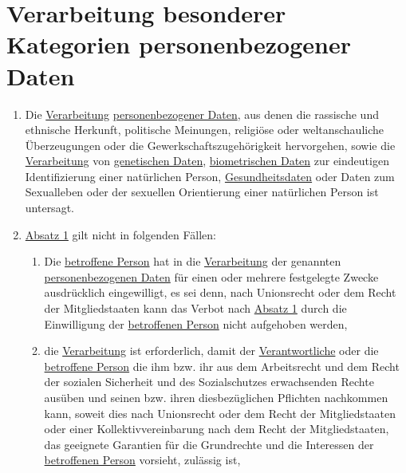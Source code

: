 \chapter{Verarbeitung besonderer Kategorien personenbezogener Daten}
\label{ch:9}


\begin{enumerate}

  \item Die \hyperref[itm:04-2]{Verarbeitung} \hyperref[itm:04-1]{personenbezogener Daten}, aus denen die rassische und ethnische Herkunft, politische Meinungen,
   religiöse oder weltanschauliche Überzeugungen oder die Gewerkschaftszugehörigkeit hervorgehen, sowie die
   \hyperref[itm:04-2]{Verarbeitung} von \hyperref[itm:04-13]{genetischen Daten}, \hyperref[itm:04-14]{biometrischen Daten} zur eindeutigen Identifizierung einer natürlichen Person,
   \hyperref[itm:04-15]{Gesundheitsdaten} oder Daten zum Sexualleben oder der sexuellen Orientierung einer natürlichen Person ist untersagt.
  \label{itm:09-1}

  \item \hyperref[itm:09-1]{Absatz 1} gilt nicht in folgenden Fällen:
  \label{itm:09-2}

  \begin{enumerate}
  
    \item Die \hyperref[itm:04-1]{betroffene Person} hat in die \hyperref[itm:04-2]{Verarbeitung} der genannten \hyperref[itm:04-1]{personenbezogenen Daten} für einen oder mehrere
     festgelegte Zwecke ausdrücklich eingewilligt, es sei denn, nach Unionsrecht oder dem Recht der Mitgliedstaaten
     kann das Verbot nach \hyperref[itm:09-1]{Absatz 1} durch die Einwilligung der \hyperref[itm:04-1]{betroffenen Person} nicht aufgehoben
     werden,
    \label{itm:09-2a}

    \item die \hyperref[itm:04-2]{Verarbeitung} ist erforderlich, damit der \hyperref[itm:04-7]{Verantwortliche} oder die \hyperref[itm:04-1]{betroffene Person} die ihm bzw. ihr aus
     dem Arbeitsrecht und dem Recht der sozialen Sicherheit und des Sozialschutzes erwachsenden Rechte ausüben und
     seinen bzw. ihren diesbezüglichen Pflichten nachkommen kann, soweit dies nach Unionsrecht oder dem Recht der
     Mitgliedstaaten oder einer Kollektivvereinbarung nach dem Recht der Mitgliedstaaten, das geeignete Garantien für
     die Grundrechte und die Interessen der \hyperref[itm:04-1]{betroffenen Person} vorsieht, zulässig ist,
    \label{itm:09-2b}


\end{enumerate}
\end{enumerate}
